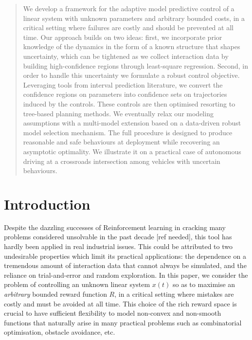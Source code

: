 \documentclass{article}
\begin{document}
\begin{abstract}
We develop a framework for the adaptive model predictive control of a linear system with unknown parameters and arbitrary bounded costs, in a critical setting where failures are costly and should be prevented at all time.  Our approach builds on two ideas: first, we incorporate prior knowledge of the dynamics in the form of a known structure that shapes uncertainty, which can be tightened as we collect interaction data by building high-confidence regions through least-square regression. Second, in order to handle this uncertainty we formulate a robust control objective. Leveraging tools from interval prediction literature, we convert the confidence regions on parameters into confidence sets on trajectories induced by the controls. These controls are then optimised resorting to tree-based planning methods. We eventually relax our modeling assumptions with a multi-model extension based on a data-driven robust model selection mechanism. The full procedure is designed to produce reasonable and safe behaviours at deployment while recovering an asymptotic optimality. We illustrate it on a practical case of autonomous driving at a crossroads intersection among vehicles with uncertain behaviours.
\end{abstract}	

\section{Introduction}

Despite the dazzling successes of Reinforcement learning in cracking many problems considered unsolvable in the past decade [ref needed], this tool has hardly been applied in real industrial issues. This could be attributed to two undesirable properties which limit its practical applications: the dependence on a tremendous amount of interaction data that cannot always be simulated, and the reliance on trial-and-error and random exploration. In this paper, we consider the problem of controlling an unknown linear system $x(t)$ so as to maximise an \emph{arbitrary} bounded reward function $R$, in a critical setting where mistakes are costly and must be avoided at all time. 
This choice of the rich reward space is crucial to have sufficient flexibility to model non-convex and non-smooth functions that naturally arise in many practical problems such as combinatorial optimisation, obstacle avoidance, etc. 
\end{document}
